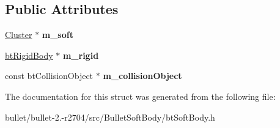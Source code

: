 \subsection*{Public Attributes}
\begin{DoxyCompactItemize}
\item 
\hypertarget{structbt_soft_body_1_1_body_acf608ebad559d263cf5a26bff6b05aab}{\hyperlink{structbt_soft_body_1_1_cluster}{Cluster} $\ast$ {\bfseries m\+\_\+soft}}\label{structbt_soft_body_1_1_body_acf608ebad559d263cf5a26bff6b05aab}

\item 
\hypertarget{structbt_soft_body_1_1_body_a31bcf62f787a0c6c46bbf523fde8c640}{\hyperlink{classbt_rigid_body}{bt\+Rigid\+Body} $\ast$ {\bfseries m\+\_\+rigid}}\label{structbt_soft_body_1_1_body_a31bcf62f787a0c6c46bbf523fde8c640}

\item 
\hypertarget{structbt_soft_body_1_1_body_afbc4164efc69fc199e26dda316f3f230}{const bt\+Collision\+Object $\ast$ {\bfseries m\+\_\+collision\+Object}}\label{structbt_soft_body_1_1_body_afbc4164efc69fc199e26dda316f3f230}

\end{DoxyCompactItemize}


The documentation for this struct was generated from the following file\+:\begin{DoxyCompactItemize}
\item 
bullet/bullet-\/2.-\/r2704/src/\+Bullet\+Soft\+Body/bt\+Soft\+Body.\+h\end{DoxyCompactItemize}
